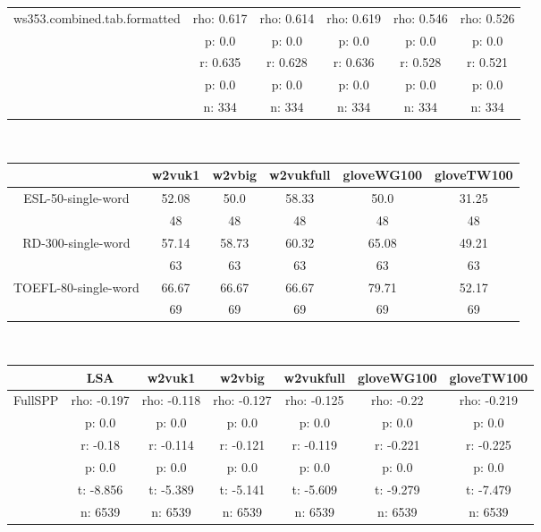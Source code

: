 \documentclass{article}
\begin{document}
\begin{tabular}{cccccc|}
\hline
\multicolumn{1}{|c|}{\multirow{5}{*}{ws353.combined.tab.formatted}} & rho: 0.617 & rho: 0.614 & rho: 0.619 & rho: 0.546 & rho: 0.526 \\
\multicolumn{1}{|c|}{} & p: 0.0 & p: 0.0 & p: 0.0 & p: 0.0 & p: 0.0 \\
\multicolumn{1}{|c|}{} & r: 0.635 & r: 0.628 & r: 0.636 & r: 0.528 & r: 0.521 \\
\multicolumn{1}{|c|}{} & p: 0.0 & p: 0.0 & p: 0.0 & p: 0.0 & p: 0.0 \\
\multicolumn{1}{|c|}{} & n: 334 & n: 334 & n: 334 & n: 334 & n: 334 \\
\hline
\end{tabular}\\
\begin{tabular}{cccccc|}\cline{2-6}
&\multicolumn{1}{|c}{w2vuk1} & w2vbig & w2vukfull & gloveWG100 & gloveTW100 \\\hline
\multicolumn{1}{|c|}{\multirow{2}{*}{ESL-50-single-word}} & 52.08 & 50.0 & 58.33 & 50.0 & 31.25 \\
\multicolumn{1}{|c|}{} & 48 & 48 & 48 & 48 & 48 \\
\hline
\multicolumn{1}{|c|}{\multirow{2}{*}{RD-300-single-word}} & 57.14 & 58.73 & 60.32 & 65.08 & 49.21 \\
\multicolumn{1}{|c|}{} & 63 & 63 & 63 & 63 & 63 \\
\hline
\multicolumn{1}{|c|}{\multirow{2}{*}{TOEFL-80-single-word}} & 66.67 & 66.67 & 66.67 & 79.71 & 52.17 \\
\multicolumn{1}{|c|}{} & 69 & 69 & 69 & 69 & 69 \\
\hline
\end{tabular}\\
\begin{tabular}{ccccccc|}\cline{2-7}
&\multicolumn{1}{|c}{LSA} & w2vuk1 & w2vbig & w2vukfull & gloveWG100 & gloveTW100 \\\hline
\multicolumn{1}{|c|}{\multirow{6}{*}{FullSPP}} & rho: -0.197 & rho: -0.118 & rho: -0.127 & rho: -0.125 & rho: -0.22 & rho: -0.219 \\
\multicolumn{1}{|c|}{} & p: 0.0 & p: 0.0 & p: 0.0 & p: 0.0 & p: 0.0 & p: 0.0 \\
\multicolumn{1}{|c|}{} & r: -0.18 & r: -0.114 & r: -0.121 & r: -0.119 & r: -0.221 & r: -0.225 \\
\multicolumn{1}{|c|}{} & p: 0.0 & p: 0.0 & p: 0.0 & p: 0.0 & p: 0.0 & p: 0.0 \\
\multicolumn{1}{|c|}{} & t: -8.856 & t: -5.389 & t: -5.141 & t: -5.609 & t: -9.279 & t: -7.479 \\
\multicolumn{1}{|c|}{} & n: 6539 & n: 6539 & n: 6539 & n: 6539 & n: 6539 & n: 6539 \\
\hline
\end{tabular}\\
\end{document}
